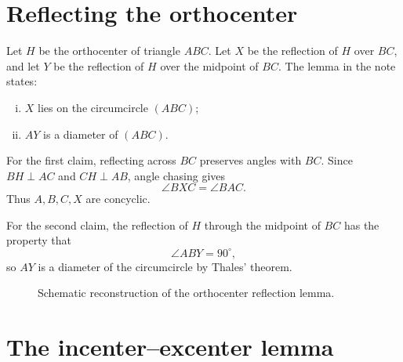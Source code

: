
\section{Reflecting the orthocenter}

Let \(H\) be the orthocenter of triangle \(ABC\).  Let \(X\) be the reflection of \(H\) over \(BC\), and let \(Y\) be the reflection of \(H\) over the midpoint of \(BC\).  The lemma in the note states:
\begin{enumerate}[(i)]
  \item \(X\) lies on the circumcircle \((ABC)\);
  \item \(AY\) is a diameter of \((ABC)\).
\end{enumerate}

For the first claim, reflecting across \(BC\) preserves angles with \(BC\).  Since \(BH\perp AC\) and \(CH\perp AB\), angle chasing gives
\[
  \angle BXC=\angle BAC.
\]
Thus \(A,B,C,X\) are concyclic.

For the second claim, the reflection of \(H\) through the midpoint of \(BC\) has the property that
\[
  \angle ABY=90^\circ,
\]
so \(AY\) is a diameter of the circumcircle by Thales' theorem.

\begin{figure}[H]
\centering
{}
\caption{Schematic reconstruction of the orthocenter reflection lemma.}
\end{figure}

\section{The incenter--excenter lemma}

